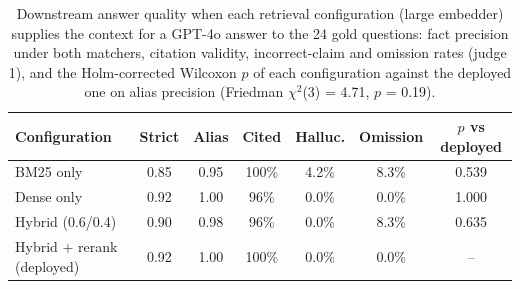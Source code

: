 \begin{table}[H]
\centering
\caption{Downstream answer quality when each retrieval configuration (large embedder) supplies the context for a GPT-4o answer to the 24 gold questions: fact precision under both matchers, citation validity, incorrect-claim and omission rates (judge 1), and the Holm-corrected Wilcoxon $p$ of each configuration against the deployed one on alias precision (Friedman $\chi^2$(3) = 4.71, $p$ = 0.19).}
\label{tab:ablation-downstream}
{\footnotesize{}\setlength{\tabcolsep}{4pt}
\begin{tabular}{lcccccc}
\toprule
\textbf{Configuration} & \textbf{Strict} & \textbf{Alias} & \textbf{Cited} & \textbf{Halluc.} & \textbf{Omission} & \textbf{$p$ vs deployed} \\
\midrule
BM25 only & 0.85 & 0.95 & 100\% & 4.2\% & 8.3\% & 0.539 \\
Dense only & 0.92 & 1.00 & 96\% & 0.0\% & 0.0\% & 1.000 \\
Hybrid (0.6/0.4) & 0.90 & 0.98 & 96\% & 0.0\% & 8.3\% & 0.635 \\
Hybrid + rerank (deployed) & 0.92 & 1.00 & 100\% & 0.0\% & 0.0\% & -- \\
\bottomrule
\end{tabular}
}
\end{table}
